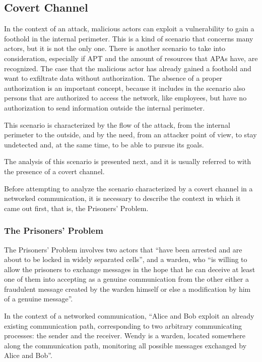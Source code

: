 \documentclass[12pt]{article}
\begin{document}
\subsection{Covert Channel}
\label{sub:covert}


In the context of an attack, malicious actors can exploit a vulnerability to gain a foothold in the internal perimeter. This is a kind of scenario that concerns many actors, but it is not the only one. There is another scenario to take into consideration, especially if APT and the amount of resources that APAs have, are recognized. The case that the malicious actor has already gained a foothold and want to exfiltrate data without authorization. The absence of a proper authorization is an important concept, because it includes in the scenario also persons that are authorized to access the network, like employees, but have no authorization to send information outside the internal perimeter.

This scenario is characterized by the flow of the attack, from the internal perimeter to the outside, and by the need, from an attacker point of view, to stay undetected and, at the same time, to be able to pursue its goals. 

The analysis of this scenario is presented next, and it is usually referred to with the presence of a covert channel.

Before attempting to analyze the scenario characterized by a covert channel in a networked communication, it is necessary to describe the context in which it came out first, that is, the Prisoners' Problem.

\subsubsection{The Prisoners' Problem}
\label{subsub:prisoners}

The Prisoners' Problem\cite{prisoners} involves two actors that ``have been arrested and are about to be locked in widely separated cells'', and a warden, who ``is willing to allow the prisoners to exchange messages in the hope that he can deceive at least one of them into accepting as a genuine communication from the other either a fraudulent message created by the warden himself or else a modification by him of a genuine message''.

In the context of a networked communication, ``Alice and Bob exploit an already existing communication path, corresponding to two arbitrary communicating processes: the sender and the receiver. Wendy is a warden, located somewhere along the communication path, monitoring all possible messages exchanged by Alice and Bob''\cite{netaware}.
\end{document}
